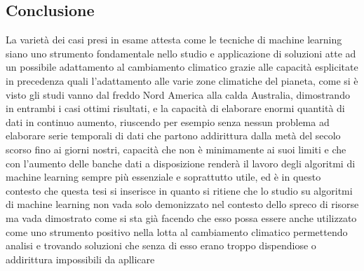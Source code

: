 \subsection{Conclusione}
La varietà dei casi presi in esame attesta come le tecniche di machine learning siano uno strumento fondamentale nello studio e applicazione di soluzioni atte ad un possibile adattamento al cambiamento climatico grazie alle capacità esplicitate in precedenza quali l'adattamento alle varie zone climatiche del pianeta, come si è visto gli studi vanno dal freddo Nord America alla calda Australia, dimostrando in entrambi i casi ottimi risultati, e la capacità di elaborare enormi quantità di dati in continuo aumento, riuscendo per esempio senza nessun problema ad elaborare serie temporali di dati che partono addirittura dalla metà del secolo scorso fino ai giorni nostri, capacità che non è minimamente ai suoi limiti e che con l'aumento delle banche dati a disposizione renderà il lavoro degli algoritmi di machine learning sempre più essenziale e soprattutto utile, ed è in questo contesto che questa tesi si inserisce in quanto si ritiene che lo studio su algoritmi di machine learning non vada solo demonizzato nel contesto dello spreco di risorse ma vada dimostrato come si sta già facendo che esso possa essere anche utilizzato come uno strumento positivo nella lotta al cambiamento climatico permettendo analisi e trovando soluzioni che senza di esso erano troppo dispendiose o addirittura impossibili da apllicare

\label{sec:sota}